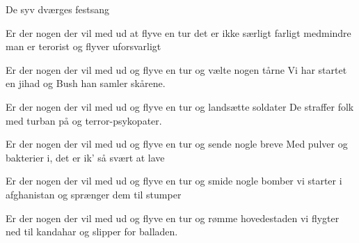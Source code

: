 {De syv dværges festsang}
{}
{
Er der nogen der vil med ud at flyve en tur
det er ikke særligt farligt
medmindre man er terorist
og flyver uforsvarligt


Er der nogen der vil med ud og flyve en tur
og vælte nogen tårne
Vi har startet en jihad
og Bush han samler skårene.



Er der nogen der vil med ud og flyve en tur
og landsætte soldater
De straffer folk med turban på
og terror-psykopater.


Er der nogen der vil med ud og flyve en tur
og sende nogle breve
Med pulver og bakterier i,
det er ik' så svært at lave


Er der nogen der vil med ud og flyve en tur
og smide nogle bomber
vi starter i afghanistan
og sprænger dem til stumper



Er der nogen der vil med ud og flyve en tur
og rømme hovedestaden
vi flygter ned til kandahar
og slipper for balladen.

}
